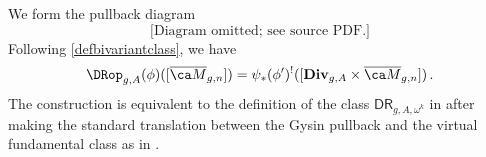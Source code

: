 We form the pullback diagram
\begin{equation}
 \text{[Diagram omitted; see source PDF.]}
\end{equation}
Following \cref{defbivariantclass}, we have
$$\DRop_{g,A}(\phi)([\Mbar_{g,n}]) = \psi_*(\phi')^!([\cat{Div}_{g,A} \times \Mbar_{g,n}])\, .$$
The construction
is equivalent to the definition of the class $\mathsf{DR}_{g,A, \omega^k}$ in \cite{Marcus2017Logarithmic-com} after making the standard translation between the Gysin pullback and the virtual fundamental class as in \cite[Example 7.6]{Behrend1997The-intrinsic-n}.










